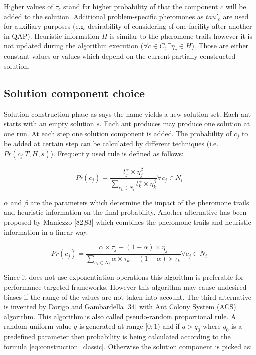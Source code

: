 \documentclass[12pt]{article}
\begin{document}
Higher values of $\tau_c$ stand for higher probability of that the component $c$ will be added to the solution. Additional problem-specific pheromones as $tau'_c$ are used for auxiliary purposes (e.g. desirability of considering of one facility after another in QAP). Heuristic information $H$ is similar to the pheromone trails however it is not updated during the algorithm execution ($\forall c \in C, \exists \eta_c \in H$). Those are either constant values or values which depend on the current partially constructed solution.

\subsection{Solution component choice}

Solution construction phase as says the name yields a new solution set. Each ant starts with an empty solution $s$. Each ant produces may produce one solution at one run. At each step one solution component is added. The probability of $c_j$ to be added at certain step can be calculated by different techniques (i.e. $Pr(c_j|T,H,s)$). Frequently used rule is defined as follows:

\begin{equation}
Pr(c_j)=\frac{t_j^\alpha \times \eta_j^\beta}{\sum \limits_{c_k \in N_i} t_k^\alpha \times \eta_k^\beta} \forall c_j \in N_i
\label{eq:construction_classic}
\end{equation}

$\alpha$ and $\beta$ are the parameters which determine the impact of the pheromone trails and heuristic information on the final probability. Another alternative has been proposed by Maniezzo [82,83] which combines the pheromone trails and heuristic information in a linear way.

\begin{equation}
Pr(c_j)=\frac{\alpha \times \tau_j + (1-\alpha) \times \eta_j}{\sum \limits_{c_k \in N_i} \alpha \times \tau_k + (1-\alpha) \times \tau_k} \forall c_j \in N_i
\end{equation}

Since it does not use exponentiation operations this algorithm is preferable for performance-targeted frameworks. However this algorithm may cause undesired biases if the range of the values are not taken into account. The third alternative is invented by Dorigo and Gambardella [34] with Ant Colony System (ACS) algorithm. This algorithm is also called pseudo-random proportional rule. A random uniform value $q$ is generated at range $[0;1)$ and if $q>q_0$ where $q_0$ is a predefined parameter then probability is being calculated according to the formula \eqref{eq:construction_classic}. Otherwise the solution component is picked as:
\end{document}
